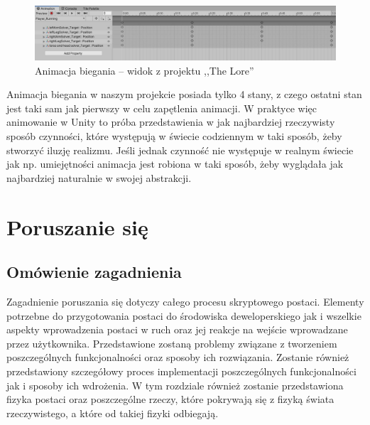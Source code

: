 \documentclass[oneside,polski,logo]{amuthesis}
\begin{document}
\begin{figure}[h]
	\centering
	\includegraphics[width=13cm]{images/kozubal/runningAnimation.jpg}
	\caption{Animacja biegania – widok z projektu ,,The Lore''}
\end{figure}

Animacja biegania w naszym projekcie posiada tylko 4 stany, z czego ostatni stan jest taki sam jak pierwszy w celu zapętlenia animacji. W praktyce więc animowanie w Unity to próba przedstawienia w jak najbardziej rzeczywisty sposób czynności, które występują w świecie codziennym w taki sposób, żeby stworzyć iluzję realizmu. Jeśli jednak czynność nie występuje w realnym świecie jak np. umiejętności animacja jest robiona w taki sposób, żeby wyglądała jak najbardziej naturalnie w swojej abstrakcji.

\section{Poruszanie się}
\subsection{Omówienie zagadnienia}
Zagadnienie poruszania się dotyczy całego procesu skryptowego postaci. Elementy potrzebne do przygotowania postaci do środowiska deweloperskiego jak i wszelkie aspekty wprowadzenia postaci w ruch oraz jej reakcje na wejście wprowadzane przez użytkownika. Przedstawione zostaną problemy związane z tworzeniem poszczególnych funkcjonalności oraz sposoby ich rozwiązania. Zostanie również przedstawiony szczegółowy proces implementacji poszczególnych funkcjonalności jak i sposoby ich wdrożenia. W tym rozdziale również zostanie przedstawiona fizyka postaci oraz poszczególne rzeczy, które pokrywają się z fizyką świata rzeczywistego, a które od takiej fizyki odbiegają.
\end{document}
